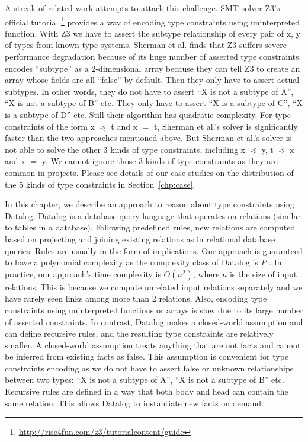 A streak of related work attempts to attack this challenge. SMT solver Z3's \cite{moura08Z3} official tutorial \footnote{\url{http://rise4fun.com/z3/tutorialcontent/guide}} provides a way of encoding type constraints using uninterpreted function.  With Z3 we have to assert the subtype relationship of every pair of x, y of types from known type systems. Sherman et al. \cite{Sherman:2015:DTP:2776776.2755971} finds that Z3 suffers severe performance degradation because of its huge number of asserted type constraints.  \cite{Islam14Generating} encodes ``subtype'' as a 2-dimensional array because they can tell Z3 to create an array whose fields are all ``false'' by default. Then they only have to assert actual subtypes. In other words, they do not have to assert ``X is not a subtype of A'', ``X is not a subtype of B'' etc. They only have to assert ``X is a subtype of C'', ``X is a subtype of D'' etc.  Still their algorithm has quadratic complexity.  For type constraints of the form x $\preceq$ t and x $=$ t, Sherman et al.'s solver \cite{Sherman:2015:DTP:2776776.2755971} is significantly faster than the two approaches mentioned above. But Sherman et al.'s solver is not able to solve the other 3 kinds of type constraints, including x $\preceq$ y, t $\preceq$ x and x $=$ y. We cannot ignore those 3 kinds of type constraints as they are common in projects.  Please see details of our case studies on the distribution of the 5 kinds of type constraints in Section~\ref{chp:case}. 

In this chapter, we describe an approach to reason about type constraints using Datalog. Datalog is a database query language that operates on relations (similar to tables in a database). Following predefined rules, new relations are computed based on projecting and joining existing relations as in relational database queries. Rules are usually in the form of implications. Our approach is guaranteed to have a polynomial complexity as the complexity class of Datalog is $P$ \cite{immerman2012descriptive}. In practice, our approach's time complexity is $O(n^2)$, where $n$ is the size of input relations.  This is because we compute unrelated input relations separately and we have rarely seen links among more than 2 relations.  Also, encoding type constraints using uninterpreted functions or arrays is slow due to its large number of asserted constraints. In contrast, Datalog makes a closed-world assumption and can define recursive rules, and the resulting type constraints are relatively smaller. A closed-world assumption treats anything that are not facts and cannot be inferred from existing facts as false. This assumption is convenient for type constraints encoding as we do not have to assert false or unknown relationships between two types: ``X is not a subtype of A'', ``X is not a subtype of B'' etc. Recursive rules are defined in a way that both body and head can contain the same relation.  This allows Datalog to instantiate new facts on demand. 

